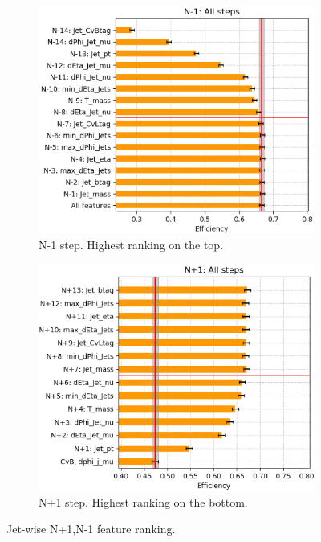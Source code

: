 \begin{figure}[H]
    \centering
    \begin{subfigure}{0.48\linewidth}
        \includegraphics[width=1\linewidth]{fig//chap08-kin_reco/n_minus1.png}
        \caption{N-1 step. Highest ranking on the top.}
    \end{subfigure}
    \hfill
    \begin{subfigure}{0.48\linewidth}   
        \includegraphics[width=1\linewidth]{fig//chap08-kin_reco/n_plus1.png}
        \caption{N+1 step. Highest ranking on the bottom.}
    \end{subfigure}  
    \caption{Jet-wise N+1,N-1 feature ranking.}
    \label{fig:n_rank}
\end{figure}




